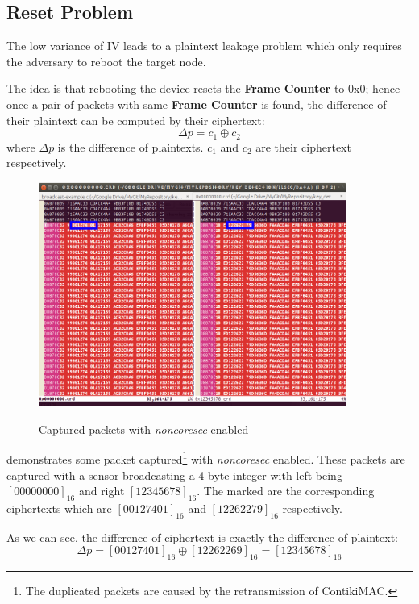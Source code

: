\subsection{Reset Problem}
The low variance of IV leads to a plaintext leakage problem which only requires the adversary to reboot the target node. 

The idea is that rebooting the device resets the \textbf{Frame Counter} to 0x0; hence once a pair of packets with same \textbf{Frame Counter} is found, the difference of their plaintext can be computed by their ciphertext:
\begin{equation*}
\Delta p = c_1 \oplus c_2
\end{equation*}
where $\Delta p$ is the difference of plaintexts. $c_1$ and $c_2$ are their ciphertext respectively.

\begin{example}
\begin{figure}
\centering
{
	\includegraphics[width=0.9\textwidth,]{fig/resetproblem.png} 
}
\caption{Captured packets with {\it noncoresec} enabled} \label{Fig: reset problem}
\end{figure}

 demonstrates some packet captured\footnote{The duplicated packets are caused by the retransmission of ContikiMAC\cite{ContikiMAC}.} with {\it noncoresec} enabled. These packets are captured with a sensor broadcasting a 4 byte integer with left being $[00000000]_{16}$ and right $[12345678]_{16}$. The marked are the corresponding ciphertexts which are $[00127401]_{16}$ and $[12262279]_{16}$ respectively.

As we can see, the difference of ciphertext is exactly the difference of plaintext:
\begin{equation}
\Delta p = [00127401]_{16} \oplus [12262269]_{16} = [12345678]_{16}
\end{equation}
\end{example}

